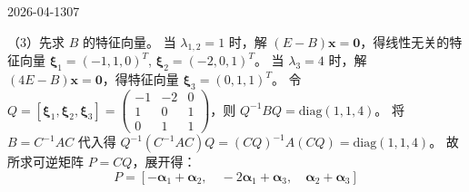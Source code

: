 \begin{mistake}{2026-04-13}{07}
\begin{solutioncontent}
（3）先求 \(B\) 的特征向量。
当 \(\lambda_{1,2} = 1\) 时，解 \((E - B)\boldsymbol{x} = \boldsymbol{0}\)，得线性无关的特征向量 \(\boldsymbol{\xi}_1 = (-1, 1, 0)^T\), \(\boldsymbol{\xi}_2 = (-2, 0, 1)^T\)。
当 \(\lambda_3 = 4\) 时，解 \((4E - B)\boldsymbol{x} = \boldsymbol{0}\)，得特征向量 \(\boldsymbol{\xi}_3 = (0, 1, 1)^T\)。
令 \(Q = [\boldsymbol{\xi}_1, \boldsymbol{\xi}_2, \boldsymbol{\xi}_3] = \begin{pmatrix} -1 & -2 & 0 \\ 1 & 0 & 1 \\ 0 & 1 & 1 \end{pmatrix}\)，则 \(Q^{-1}BQ = \text{diag}(1, 1, 4)\)。
将 \(B = C^{-1}AC\) 代入得 \(Q^{-1}(C^{-1}AC)Q = (CQ)^{-1}A(CQ) = \text{diag}(1, 1, 4)\)。
故所求可逆矩阵 \(P = CQ\)，展开得：
\[
P = [-\boldsymbol{\alpha}_1 + \boldsymbol{\alpha}_2, \quad -2\boldsymbol{\alpha}_1 + \boldsymbol{\alpha}_3, \quad \boldsymbol{\alpha}_2 + \boldsymbol{\alpha}_3]
\]
\end{solutioncontent}


\end{mistake}
